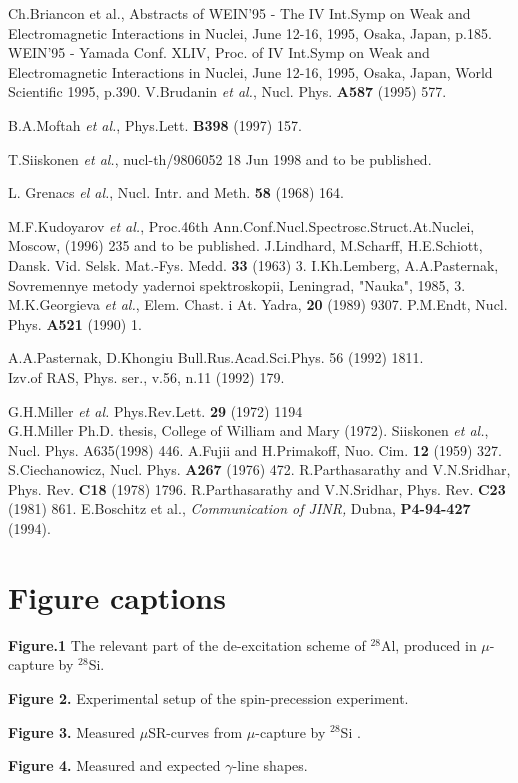 \begin{thebibliography}{99}
Ch.Briancon et al.,
Abstracts of WEIN'95 - The IV Int.Symp on Weak and Electromagnetic
Interactions in Nuclei, June 12-16, 1995, Osaka, Japan, p.185. \\
WEIN'95 - Yamada Conf. XLIV, Proc. of IV Int.Symp on Weak and
Electromagnetic Interactions in Nuclei, June 12-16, 1995, Osaka,
Japan, World Scientific 1995, p.390.
 \label{brud}
  V.Brudanin {\it et al.}, Nucl. Phys. {\bf A587} (1995) 577.

B.A.Moftah {\it et al.}, Phys.Lett. {\bf B398} (1997) 157.

T.Siiskonen {\it et al.}, nucl-th/9806052 18 Jun 1998 and to be
published.

L. Grenacs {\it el al.}, Nucl. Intr. and Meth. {\bf 58} (1968) 164.

M.F.Kudoyarov {\it et al.}, Proc.46th
Ann.Conf.Nucl.Spectrosc.Struct.At.Nuclei, 
Moscow, (1996) 235 and to be published.
 J.Lindhard, M.Scharff, H.E.Schiott, Dansk. Vid. Selsk. Mat.-Fys. Medd.
    {\bf 33} (1963) 3.
 I.Kh.Lemberg, A.A.Pasternak,  Sovremennye metody yadernoi
    spektroskopii, Leningrad, "Nauka", 1985, 3.
 M.K.Georgieva {\it et al.}, Elem. Chast. i At. Yadra, {\bf 20} (1989)
9307.
P.M.Endt, Nucl. Phys. {\bf A521} (1990) 1.

A.A.Pasternak, D.Khongiu Bull.Rus.Acad.Sci.Phys. 56 (1992) 1811.\\
Izv.of RAS, Phys. ser., v.56, n.11 (1992) 179.

G.H.Miller {\it et al.} Phys.Rev.Lett. {\bf 29} (1972) 1194\\
G.H.Miller Ph.D. thesis, College of William and Mary (1972).
Siiskonen {\it et al.}, Nucl. Phys. A635(1998) 446.
 A.Fujii and H.Primakoff, Nuo. Cim. {\bf 12} (1959) 327.
 S.Ciechanowicz, Nucl. Phys. {\bf A267} (1976) 472.
 R.Parthasarathy and V.N.Sridhar, Phys. Rev. {\bf C18} (1978) 1796.
 R.Parthasarathy and V.N.Sridhar, Phys. Rev. {\bf C23} (1981) 861.
 E.Boschitz et al., {\it Communication of JINR,} Dubna, {\bf P4-94-427}
(1994).
\end{thebibliography}

\section{Figure captions}

{\bf Figure.1} The relevant part of the de-excitation scheme of
$^{28}$Al, 
produced in  $\mu$-capture by $^{28}$Si.

{\bf Figure 2.} Experimental setup of the spin-precession experiment.

{\bf Figure 3.} Measured $\mu$SR-curves from $\mu$-capture by $^{28}$Si
.


{\bf Figure 4.} Measured and expected $\gamma$-line shapes.




